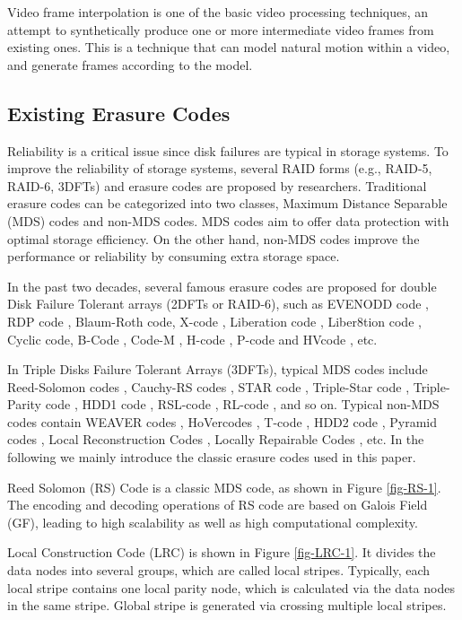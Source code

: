\documentclass[sigconf]{acmart}
\begin{document}
Video frame interpolation is one of the basic video processing techniques, an attempt to synthetically produce one or more intermediate video frames from existing ones. This is a technique that can model natural motion within a video, and generate frames according to the model.

\subsection{Existing Erasure Codes}\label{existEC}

Reliability is a critical issue since disk failures are typical in storage systems. To improve the reliability of storage systems, several RAID forms (e.g., RAID-5, RAID-6, 3DFTs) and erasure codes are proposed by researchers.  Traditional erasure codes can be categorized into two classes, Maximum Distance Separable (MDS) codes and non-MDS codes. MDS codes aim to offer data protection with optimal storage efficiency. On the other hand, non-MDS codes improve the performance or reliability by consuming extra storage space.

In the past two decades, several famous erasure codes are proposed for double Disk Failure Tolerant arrays (2DFTs or RAID-6), such as EVENODD code \cite{EVENODD}, RDP code \cite{RDP}, Blaum-Roth code\cite{BlaumRoth}, X-code \cite{XCode}, Liberation code \cite{Liberation}, Liber8tion code \cite{Liber8tion}, Cyclic \cite {Cyclic} code, B-Code \cite{BCode}, Code-M \cite{Code-M}, H-code \cite{hcode}, P-code \cite{PCode} and HVcode \cite{HVCode}, etc.

In Triple Disks Failure Tolerant Arrays (3DFTs), typical MDS codes include Reed-Solomon codes \cite{RS}, Cauchy-RS codes \cite{CRS}, STAR code \cite{STAR}, Triple-Star code \cite{TripleStar}, Triple-Parity code \cite{TPtech}, HDD1 code \cite{HDD}, RSL-code \cite{RSL}, RL-code \cite{RL}, and so on. Typical non-MDS codes contain WEAVER codes \cite{WEAVER}, HoVercodes \cite{HoVer}, T-code \cite{TCode}, HDD2 code \cite{HDD}, Pyramid codes \cite{Pyramid}, Local Reconstruction Codes \cite{LRC}, Locally Repairable Codes \cite{XORing}, etc.
In the following we mainly introduce the classic erasure codes used in this paper.

Reed Solomon (RS) Code \cite{RS} is a classic MDS code, as shown in Figure \ref{fig-RS-1}. The encoding and decoding operations of RS code are based on Galois Field (GF), leading to high scalability as well as high computational complexity.

Local Construction Code (LRC) \cite{LRC} 
is shown in Figure \ref{fig-LRC-1}. It divides the data nodes into several groups, which are called local stripes. Typically, each local stripe contains one local parity node, which is calculated via the data nodes in the same stripe. Global stripe is generated via crossing multiple local stripes.
\end{document}
